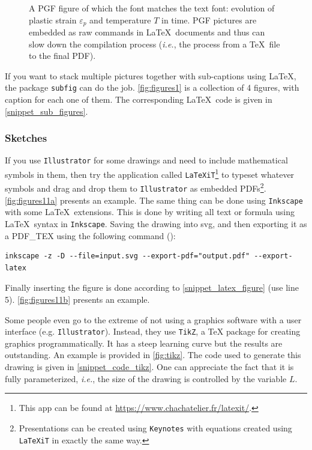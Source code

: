 \documentclass[authoryear,3p,times,preprint,review,fleqn]{elsarticle}
\newcommand{\ie}{\textit{i.e.},\xspace}
\numberwithin{equation}{section}
\theoremstyle{remark}
\begin{document}
\begin{figure}[!h]
  \centering
  
  \caption{A PGF figure of which the font matches the text font: 
  evolution of plastic strain $\varepsilon_p$ and temperature  $T$ in time. PGF pictures are embedded as raw commands in \LaTeX\ documents and thus can slow down the compilation process (\ie the process from a \TeX\ file to the final PDF).}
  \label{fig:cold-spray-plot-pgf}
\end{figure}



If you want to stack multiple pictures together with sub-captions using \LaTeX, the package \texttt{subfig} can do the job. \cref{fig:figures1} is a collection of 4 figures, with caption for each one of them. The corresponding \LaTeX\ code is given in \cref{snippet_sub_figures}.

\subsubsection{Sketches}\label{sec:sketches}

If you use \texttt{Illustrator} for some drawings and need to include mathematical symbols in them, then try the application called \texttt{LaTeXiT}\footnote{This app can be found at \url{https://www.chachatelier.fr/latexit/}.} to typeset whatever symbols and drag and drop them to \texttt{Illustrator} as embedded PDFs\footnote{Presentations can be created using \texttt{Keynotes} with equations created using \texttt{LaTeXiT} in exactly the same way.}.  \cref{fig:figures11a} presents an example. The same thing can be done using \texttt{Inkscape} with some \LaTeX\ extensions. This is done by writing all text or formula using \LaTeX\ syntax in \texttt{Inkscape}. Saving the drawing into svg, and then exporting it as a PDF\_TEX using the following command (\cite{inkscape}):
\begin{verbatim}
inkscape -z -D --file=input.svg --export-pdf="output.pdf" --export-latex
\end{verbatim}
Finally inserting the figure is done according to \cref{snippet_latex_figure} (use line 5). \cref{fig:figures11b} presents an example.

Some people even go to the extreme of not using a graphics software with a user interface (e.g. \texttt{Illustrator}). Instead, they use  \texttt{TikZ}, a TeX package for creating graphics programmatically. It has a steep learning curve but the results are outstanding. An example is provided in \cref{fig:tikz}. The code used to generate this drawing is given in \cref{snippet_code_tikz}. One can appreciate the fact that it is fully parameterized, \ie the size of the drawing is controlled by the variable $L$.
\end{document}
